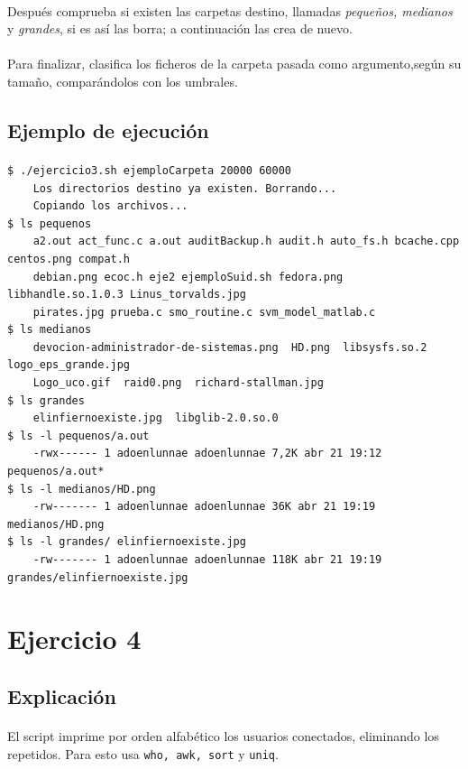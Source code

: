 \documentclass[12pt,a4paper]{article}
\begin{document}
\paragraph{}
Después comprueba si existen las carpetas destino, llamadas \textit{pequeños, medianos} y \textit{grandes}, si es así las borra; a continuación las crea de nuevo.
\paragraph{}
Para finalizar, clasifica los ficheros de la carpeta pasada como argumento,según su tamaño, comparándolos con los umbrales. 
\subsection{Ejemplo de ejecución}
\paragraph{}
\begin{lstlisting}[basicstyle=\ttfamily\scriptsize]
$ ./ejercicio3.sh ejemploCarpeta 20000 60000
	Los directorios destino ya existen. Borrando...
	Copiando los archivos...
$ ls pequenos
	a2.out act_func.c a.out auditBackup.h audit.h auto_fs.h bcache.cpp centos.png compat.h 
	debian.png ecoc.h eje2 ejemploSuid.sh fedora.png libhandle.so.1.0.3 Linus_torvalds.jpg 
	pirates.jpg prueba.c smo_routine.c svm_model_matlab.c
$ ls medianos
	devocion-administrador-de-sistemas.png  HD.png  libsysfs.so.2  logo_eps_grande.jpg  
	Logo_uco.gif  raid0.png  richard-stallman.jpg
$ ls grandes
	elinfiernoexiste.jpg  libglib-2.0.so.0
$ ls -l pequenos/a.out
	-rwx------ 1 adoenlunnae adoenlunnae 7,2K abr 21 19:12 pequenos/a.out*
$ ls -l medianos/HD.png
	-rw------- 1 adoenlunnae adoenlunnae 36K abr 21 19:19 medianos/HD.png
$ ls -l grandes/ elinfiernoexiste.jpg
	-rw------- 1 adoenlunnae adoenlunnae 118K abr 21 19:19 grandes/elinfiernoexiste.jpg
\end{lstlisting}
\pagebreak
\section{Ejercicio 4}
\subsection{Explicación}
\paragraph{}
El script imprime por orden alfabético los usuarios conectados, eliminando los repetidos. Para esto usa \texttt{who, awk, sort} y \texttt{uniq}.
\end{document}

